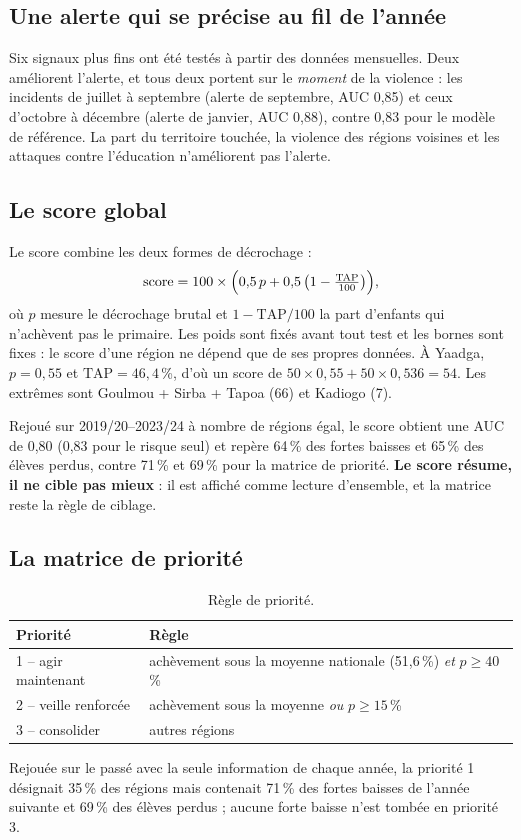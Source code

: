 \documentclass[11pt,a4paper]{article}
\begin{document}
\subsection{Une alerte qui se précise au fil de l'année}
Six signaux plus fins ont été testés à partir des données mensuelles. Deux améliorent l'alerte, et tous deux portent sur le \emph{moment} de la violence : les incidents de juillet à septembre (alerte de septembre, AUC 0{,}85) et ceux d'octobre à décembre (alerte de janvier, AUC 0{,}88), contre 0{,}83 pour le modèle de référence. La part du territoire touchée, la violence des régions voisines et les attaques contre l'éducation n'améliorent pas l'alerte.

\subsection{Le score global}
Le score combine les deux formes de décrochage :
\begin{equation}
\text{score} = 100 \times \Bigl(0{,}5\,p + 0{,}5\,\bigl(1 - \tfrac{\text{TAP}}{100}\bigr)\Bigr),
\end{equation}
où $p$ mesure le décrochage brutal et $1-\text{TAP}/100$ la part d'enfants qui n'achèvent pas le primaire. Les poids sont fixés avant tout test et les bornes sont fixes : le score d'une région ne dépend que de ses propres données. À Yaadga, $p = 0{,}55$ et $\text{TAP} = 46{,}4$\,\%, d'où un score de $50 \times 0{,}55 + 50 \times 0{,}536 = 54$. Les extrêmes sont Goulmou + Sirba + Tapoa (66) et Kadiogo (7).

Rejoué sur 2019/20--2023/24 à nombre de régions égal, le score obtient une AUC de 0{,}80 (0{,}83 pour le risque seul) et repère 64\,\% des fortes baisses et 65\,\% des élèves perdus, contre 71\,\% et 69\,\% pour la matrice de priorité. \textbf{Le score résume, il ne cible pas mieux} : il est affiché comme lecture d'ensemble, et la matrice reste la règle de ciblage.

\subsection{La matrice de priorité}
\begin{table}[H]\centering\small
\begin{tabular}{@{}ll@{}}\toprule
Priorité & Règle\\\midrule
1 -- agir maintenant & achèvement sous la moyenne nationale (51,6\,\%) \emph{et} $p \geq 40$\,\%\\
2 -- veille renforcée & achèvement sous la moyenne \emph{ou} $p \geq 15$\,\%\\
3 -- consolider & autres régions\\\bottomrule
\end{tabular}\caption{Règle de priorité.}\end{table}
Rejouée sur le passé avec la seule information de chaque année, la priorité 1 désignait 35\,\% des régions mais contenait 71\,\% des fortes baisses de l'année suivante et 69\,\% des élèves perdus ; aucune forte baisse n'est tombée en priorité 3.
\end{document}
